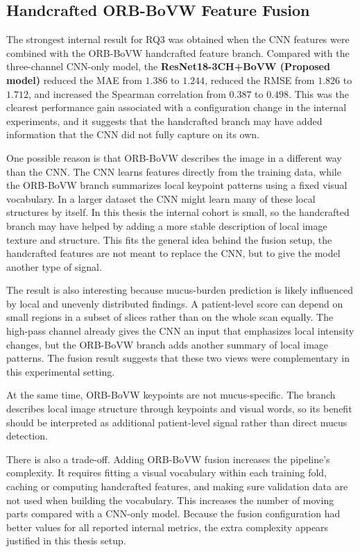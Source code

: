 \subsection{Handcrafted ORB-BoVW Feature Fusion}
The strongest internal result for RQ3 was obtained when the CNN features were combined with the ORB-BoVW handcrafted feature branch. Compared with the three-channel CNN-only model, the \textbf{ResNet18-3CH+BoVW (Proposed model)} reduced the MAE from \(1.386\) to \(\mathbf{1.244}\), reduced the RMSE from \(1.826\) to \(\mathbf{1.712}\), and increased the Spearman correlation from \(0.387\) to \(\mathbf{0.498}\). This was the clearest performance gain associated with a configuration change in the internal experiments, and it suggests that the handcrafted branch may have added information that the CNN did not fully capture on its own.

One possible reason is that ORB-BoVW describes the image in a different way than the CNN. The CNN learns features directly from the training data, while the ORB-BoVW branch summarizes local keypoint patterns using a fixed visual vocabulary. In a larger dataset the CNN might learn many of these local structures by itself. In this thesis the internal cohort is small, so the handcrafted branch may have helped by adding a more stable description of local image texture and structure. This fits the general idea behind the fusion setup, the handcrafted features are not meant to replace the CNN, but to give the model another type of signal.

The result is also interesting because mucus-burden prediction is likely influenced by local and unevenly distributed findings. A patient-level score can depend on small regions in a subset of slices rather than on the whole scan equally. The high-pass channel already gives the CNN an input that emphasizes local intensity changes, but the ORB-BoVW branch adds another summary of local image patterns. The fusion result suggests that these two views were complementary in this experimental setting.

At the same time, ORB-BoVW keypoints are not mucus-specific. The branch describes local image structure through keypoints and visual words, so its benefit should be interpreted as additional patient-level signal rather than direct mucus detection.

There is also a trade-off. Adding ORB-BoVW fusion increases the pipeline's complexity. It requires fitting a visual vocabulary within each training fold, caching or computing handcrafted features, and making sure validation data are not used when building the vocabulary. This increases the number of moving parts compared with a CNN-only model. Because the fusion configuration had better values for all reported internal metrics, the extra complexity appears justified in this thesis setup.

